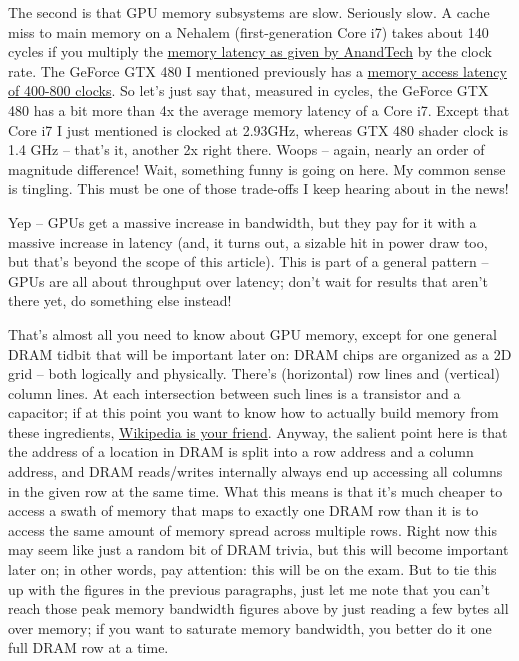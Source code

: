 \documentclass[12pt]{article}
\begin{document}
The second is that GPU memory subsystems are slow. Seriously slow. A cache miss to main memory on a Nehalem (first-generation Core i7) takes about 140 cycles if you multiply the \href{http://www.anandtech.com/show/2542/5}{memory latency as given by AnandTech} by the clock rate. The GeForce GTX 480 I mentioned previously has a \href{http://www.stanford.edu/dept/ICME/docs/seminars/Rennich-2011-04-25.pdf}{memory access latency of 400-800 clocks}. So let’s just say that, measured in cycles, the GeForce GTX 480 has a bit more than 4x the average memory latency of a Core i7. Except that Core i7 I just mentioned is clocked at 2.93GHz, whereas GTX 480 shader clock is 1.4 GHz – that’s it, another 2x right there. Woops – again, nearly an order of magnitude difference! Wait, something funny is going on here. My common sense is tingling. This must be one of those trade-offs I keep hearing about in the news!

Yep – GPUs get a massive increase in bandwidth, but they pay for it with a massive increase in latency (and, it turns out, a sizable hit in power draw too, but that’s beyond the scope of this article). This is part of a general pattern – GPUs are all about throughput over latency; don’t wait for results that aren’t there yet, do something else instead!

That’s almost all you need to know about GPU memory, except for one general DRAM tidbit that will be important later on: DRAM chips are organized as a 2D grid – both logically and physically. There’s (horizontal) row lines and (vertical) column lines. At each intersection between such lines is a transistor and a capacitor; if at this point you want to know how to actually build memory from these ingredients, \href{https://en.wikipedia.org/wiki/Dynamic\_random-access\_memory\#Operation\_principle}{Wikipedia is your friend}. Anyway, the salient point here is that the address of a location in DRAM is split into a row address and a column address, and DRAM reads/writes internally always end up accessing all columns in the given row at the same time. What this means is that it’s much cheaper to access a swath of memory that maps to exactly one DRAM row than it is to access the same amount of memory spread across multiple rows. Right now this may seem like just a random bit of DRAM trivia, but this will become important later on; in other words, pay attention: this will be on the exam. But to tie this up with the figures in the previous paragraphs, just let me note that you can’t reach those peak memory bandwidth figures above by just reading a few bytes all over memory; if you want to saturate memory bandwidth, you better do it one full DRAM row at a time.
\end{document}
